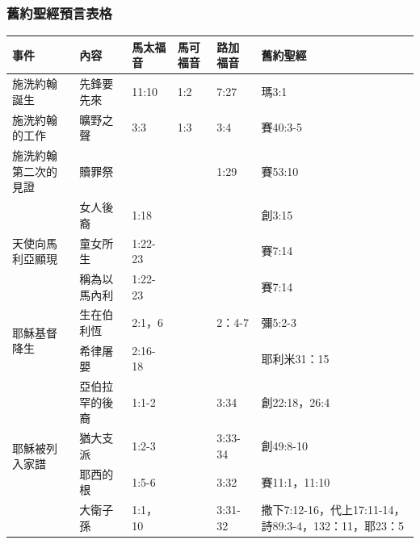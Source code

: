 \subsubsection{舊約聖經預言表格}
\begin{table}[htbp]
  \centering
    \begin{tabular}{|p{10.72em}|p{9.11em}|p{4.445em}|l|l|p{8.39em}|}
    \toprule
    \multicolumn{1}{|l|}{\textbf{事件}} & \multicolumn{1}{l|}{\textbf{內容}} & \multicolumn{1}{l|}{\textbf{馬太福音}} & \multicolumn{1}{l|}{\textbf{馬可福音}} & \multicolumn{1}{l|}{\textbf{路加福音}} &   \multicolumn{1}{l|}{\textbf{舊約聖經}} \\
    \midrule
               施洗約翰誕生 & 先鋒要先來 & 11:10 & \multicolumn{1}{p{4.39em}|}{1:2} & \multicolumn{1}{p{4.165em}|}{7:27} &瑪3:1 \\
    \midrule
    施洗約翰的工作 & 曠野之聲  & 3:3  & \multicolumn{1}{p{4.39em}|}{1:3} & \multicolumn{1}{p{4.165em}|}{ 3:4} &        賽40:3-5 \\
    \midrule
    施洗約翰第二次的見證 & 贖罪祭   &   &       &    1:29   &        賽53:10 \\
  \midrule      
    \multirow{3}{*}{天使向馬利亞顯現} & 女人後裔  & 1:18 &       &       &        創3:15 \\
\cmidrule{2-6}    \multicolumn{1}{|r|}{} & 童女所生  & 1:22-23 &       &       &        賽7:14 \\
\cmidrule{2-6}    \multicolumn{1}{|r|}{} & 稱為以馬內利 & 1:22-23 &       &       &        賽7:14 \\
    \midrule
     \multirow{2}{*}{耶穌基督降生}  & 生在伯利恆 & 2:1，6 &       & \multicolumn{1}{p{4.165em}|}{2：4-7} &        彌5:2-3 \\
   \cmidrule{2-6}    \multicolumn{1}{|r|}{}    & 希律屠嬰   & 2:16-18 &       &  &        耶利米31：15 \\
    \midrule
    \multirow{4}{*}{耶穌被列入家譜} & 亞伯拉罕的後裔 & 1:1-2 &       & \multicolumn{1}{p{4.165em}|}{3:34} &        創22:18，26:4 \\
\cmidrule{2-6}    \multicolumn{1}{|r|}{} & 猶大支派  &1:2-3 &       & \multicolumn{1}{p{4.165em}|}{3:33-34} &        創49:8-10 \\
\cmidrule{2-6}    \multicolumn{1}{|r|}{} & 耶西的根  & 1:5-6 &       & \multicolumn{1}{p{4.165em}|}{3:32} &        賽11:1，11:10 \\
\cmidrule{2-6}    \multicolumn{1}{|r|}{} & 大衛子孫  & 1:1，10 &       & \multicolumn{1}{p{4.165em}|}{3:31-32} &        撒下7:12-16，代上17:11-14，詩89:3-4，132：11，耶23：5 \\

\end{tabular}
\end{table}
